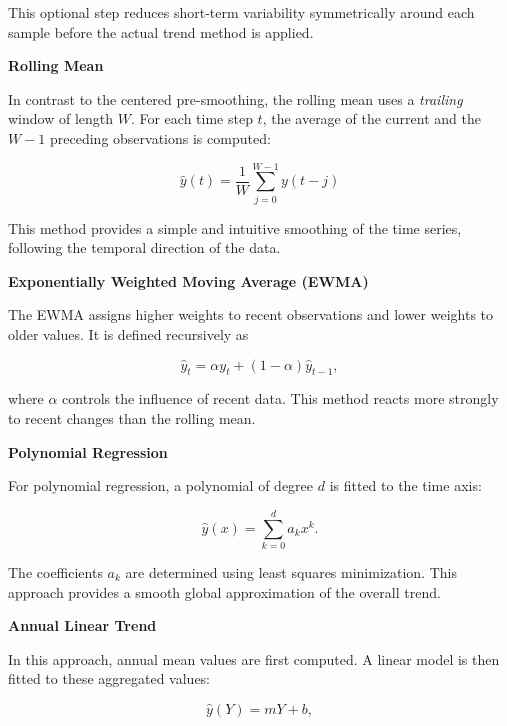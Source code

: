 This optional step reduces short-term variability symmetrically around each
sample before the actual trend method is applied.

\vspace{1em}
\noindent\textbf{Rolling Mean}

In contrast to the centered pre-smoothing, the rolling mean uses a
\emph{trailing} window of length $W$. For each time step $t$, the average of
the current and the $W-1$ preceding observations is computed:

\begin{equation}
\hat{y}(t) = \frac{1}{W} \sum_{j=0}^{W-1} y(t-j)
\end{equation}

This method provides a simple and intuitive smoothing of the time series,
following the temporal direction of the data.

\vspace{1em}
\noindent\textbf{Exponentially Weighted Moving Average (EWMA)}

The EWMA assigns higher weights to recent observations and lower weights 
to older values. It is defined recursively as

\begin{equation}
\hat{y}_t = \alpha y_t + (1-\alpha)\hat{y}_{t-1},
\end{equation}

where $\alpha$ controls the influence of recent data. 
This method reacts more strongly to recent changes than the rolling mean.

\vspace{1em}
\noindent\textbf{Polynomial Regression}

For polynomial regression, a polynomial of degree $d$ is fitted to the time 
axis:

\begin{equation}
\hat{y}(x) = \sum_{k=0}^{d} a_k x^k.
\end{equation}

The coefficients $a_k$ are determined using least squares minimization. This approach provides a smooth global approximation of the overall trend.

\vspace{1em}
\noindent\textbf{Annual Linear Trend}

In this approach, annual mean values are first computed. A linear model is then fitted to these aggregated values:

\begin{equation}
\hat{y}(Y) = mY + b,
\end{equation}

